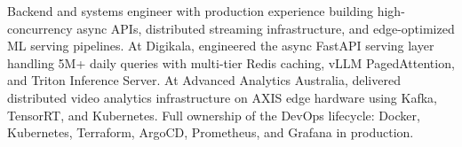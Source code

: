 \small{Backend and systems engineer with production experience building high-concurrency async APIs, distributed streaming infrastructure, and edge-optimized ML serving pipelines. At Digikala, engineered the async FastAPI serving layer handling 5M+ daily queries with multi-tier Redis caching, vLLM PagedAttention, and Triton Inference Server. At Advanced Analytics Australia, delivered distributed video analytics infrastructure on AXIS edge hardware using Kafka, TensorRT, and Kubernetes. Full ownership of the DevOps lifecycle: Docker, Kubernetes, Terraform, ArgoCD, Prometheus, and Grafana in production.}\vspace{3pt}
